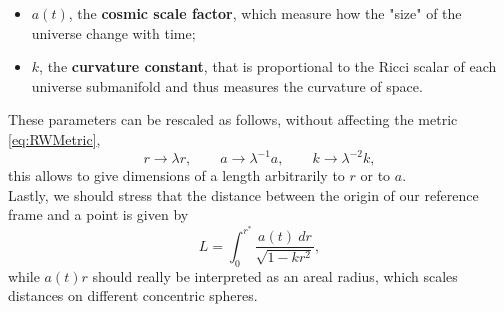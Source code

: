 \begin{itemize}
    \item $a(t)$, the \textbf{cosmic scale factor}, which measure how the "size" of the universe change with time;
    \item $k$, the \textbf{curvature constant}, that is proportional to the Ricci scalar of each universe submanifold and thus measures the curvature of space.
\end{itemize}
These parameters can be rescaled as follows, without affecting the metric \eqref{eq:RWMetric},
\begin{equation*}
    r\rightarrow\lambda r,\qquad a\rightarrow\lambda^{-1} a,\qquad k\rightarrow\lambda^{-2} k,
\end{equation*}
this allows to give dimensions of a length arbitrarily to $r$ or to $a$.\\
Lastly, we should stress that the distance between the origin of our reference frame and a point is given by
\begin{equation*}
    L=\int_{0}^{r^*}\frac{a(t)\ dr}{\sqrt{1-kr^2}},
\end{equation*}
while $a(t)r$ should really be interpreted as an areal radius, which scales distances on different concentric spheres. 

